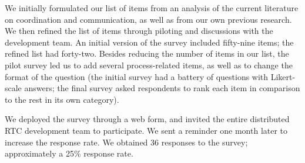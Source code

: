 \documentclass{sig-alternate}
\begin{document}
We initially formulated our list of items from an analysis of the current literature on coordination and communication, as well as from our own previous research. We then refined the list of items through piloting and discussions with the development team. An initial version of the survey included fifty-nine items; the refined list had forty-two. Besides reducing the number of items in our list, the pilot survey led us to add several process-related items, as well as to change the format of the question (the initial survey had a battery of questions with Likert-scale answers; the final survey asked respondents to rank each item in comparison to the rest in its own category).

We deployed the survey through a web form, and invited the entire distributed RTC development team to participate. We sent a reminder one month later to increase the response rate. We obtained 36 responses to the survey; approximately a 25\% response rate.
\end{document}
